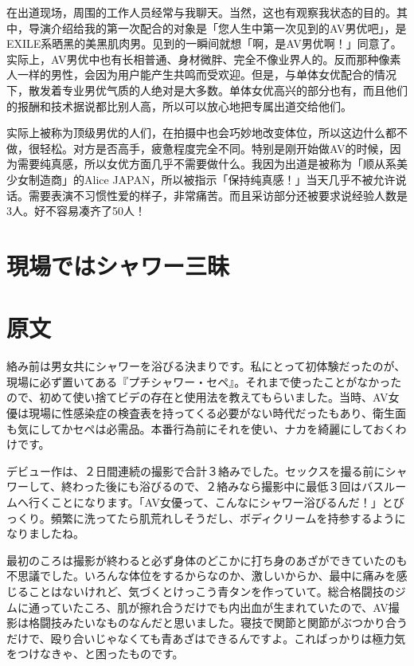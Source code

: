 \documentclass[12pt,UTF8]{ctexbook}
\begin{document}
在出道现场，周围的工作人员经常与我聊天。当然，这也有观察我状态的目的。其中，导演介绍给我的第一次配合的对象是「您人生中第一次见到的AV男优吧」，是EXILE系晒黑的美黑肌肉男。见到的一瞬间就想「啊，是AV男优啊！」同意了。实际上，AV男优中也有长相普通、身材微胖、完全不像业界人的。反而那种像素人一样的男性，会因为用户能产生共鸣而受欢迎。但是，与单体女优配合的情况下，散发着专业男优气质的人绝对是大多数。单体女优高兴的部分也有，而且他们的报酬和技术据说都比别人高，所以可以放心地把专属出道交给他们。

实际上被称为顶级男优的人们，在拍摄中也会巧妙地改变体位，所以这边什么都不做，很轻松。对方是否高手，疲惫程度完全不同。特别是刚开始做AV的时候，因为需要纯真感，所以女优方面几乎不需要做什么。我因为出道是被称为「顺从系美少女制造商」的Alice JAPAN，所以被指示「保持纯真感！」当天几乎不被允许说话。需要表演不习惯性爱的样子，非常痛苦。而且采访部分还被要求说经验人数是3人。好不容易凑齐了50人！

\switchcolumn

\section{現場ではシャワー三昧}

\switchcolumn

\section*{原文}

絡み前は男女共にシャワーを浴びる決まりです。私にとって初体験だったのが、現場に必ず置いてある『プチシャワー・セペ』。それまで使ったことがなかったので、初めて使い捨てビデの存在と使用法を教えてもらいました。当時、AV女優は現場に性感染症の検査表を持ってくる必要がない時代だったもあり、衛生面も気にしてかセペは必需品。本番行為前にそれを使い、ナカを綺麗にしておくわけです。

デビュー作は、２日間連続の撮影で合計３絡みでした。セックスを撮る前にシャワーして、終わった後にも浴びるので、２絡みなら撮影中に最低３回はバスルームへ行くことになります。「AV女優って、こんなにシャワー浴びるんだ！」とびっくり。頻繁に洗ってたら肌荒れしそうだし、ボディクリームを持参するようになりましたね。

最初のころは撮影が終わると必ず身体のどこかに打ち身のあざができていたのも不思議でした。いろんな体位をするからなのか、激しいからか、最中に痛みを感じることはないけれど、気づくとけっこう青タンを作っていて。総合格闘技のジムに通っていたころ、肌が擦れ合うだけでも内出血が生まれていたので、AV撮影は格闘技みたいなものなんだと思いました。寝技で関節と関節がぶつかり合うだけで、殴り合いじゃなくても青あざはできるんですよ。こればっかりは極力気をつけなきゃ、と困ったものです。
\end{document}
